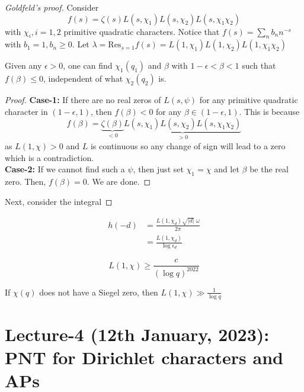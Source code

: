 \documentclass[oneside, 12pt, ]{scrbook}
\theoremstyle{theorem}
\begin{document}
\begin{proof}[Goldfeld's proof]
Consider $$f(s) = \zeta(s)L(s,\chi_{1})L(s,\chi_{2})L(s,\chi_{1}\chi_{2})$$ with $\chi_{i}, i=1,2$ primitive quadratic characters. Notice that $f(s) = \sum_{n} b_{n}n^{-s}$ with $b_{1} =1 , b_{n} \geq 0$. Let $\lambda = \mathrm{Res}_{s=1}f(s) = L(1,\chi_{1})L(1,\chi_{2})L(1,\chi_{1}\chi_{2})$

\begin{lemma}
Given any $\epsilon >0$, one can find $\chi_{1}(q_{1})$ and $\beta$ with $1-\epsilon < \beta < 1$ such that $f(\beta) \le 0$, independent of what $\chi_{2}(q_{2})$ is. 
\end{lemma}

\begin{proof}
\textbf{Case-1:} If there are no real zeros of $L(s, \psi)$ for any primitive quadratic character in $(1-\epsilon,1)$, then $f(\beta) < 0$ for any $\beta \in (1 - \epsilon,1)$. This is because $$f(\beta) = \underbrace{\zeta(\beta)}_{<0} \underbrace{L(s,\chi_{1})L(s,\chi_{2})L(s,\chi_{1}\chi_{2})}_{>0}$$ as $L(1,\chi)>0$ and $L$ is continuous so any change of sign will lead to a zero which is a contradiction. \\
\textbf{Case-2:} If we cannot find such a $\psi$, then just set $\chi_{1}=\chi$ and let $\beta$ be the real zero. Then, $f(\beta)=0$. We are done. 
\end{proof}

Next, consider the integral 

\end{proof}

\begin{corollary}
\begin{align*}
h(-d) &= \frac{L(1,\chi_{d}) \sqrt{|d|} \;\omega}{2 \pi} \\
&= \frac{L(1,\chi_{d})}{\log \epsilon_{d}}
\end{align*}
\end{corollary}

\begin{theorem}[Y. Zhang]
$$L(1, \chi) \geq \frac{c}{(\log q)^{2022}}$$
\end{theorem}

\begin{theorem}
If $\chi(q)$ does not have a Siegel zero, then $L(1, \chi) \gg \frac{1}{\log q}$
\end{theorem}


\chapter{Lecture-4 (12th January, 2023): PNT for Dirichlet characters and APs}
\end{document}
